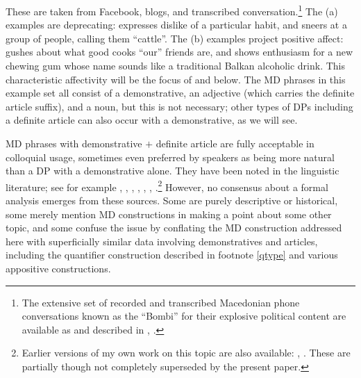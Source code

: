 \documentclass[output=paper,
colorlinks,
citecolor=brown,
newtxmath
]{langscibook}
\begin{document}
\noindent These are taken from Facebook, blogs, and transcribed conversation.\footnote{The extensive set of recorded and transcribed Macedonian phone conversations known as the ``Bombi'' for their explosive political content are available as \cite{Prizma2015} and described in \cite{Friedman2016}, \cite{Friedman2019}.} The (a) examples are deprecating:  expresses dislike of a particular habit, and  sneers at a group of people, calling them ``cattle''. The (b) examples project positive affect:  gushes about what good cooks ``our'' friends are, and  shows enthusiasm for a new chewing gum whose name sounds like a traditional Balkan alcoholic drink. This characteristic affectivity will be the focus of  and  below. The MD phrases in this example set all consist of a demonstrative, an adjective (which carries the definite article suffix), and a noun, but this is not necessary; other types of DPs including a definite article can also occur with a demonstrative, as we will see.

MD phrases with demonstrative $+$ definite article are fully acceptable in colloquial usage, sometimes even preferred by speakers as being more natural than a DP with a demonstrative alone. They have been noted in the linguistic literature; see for example \cite{Ugrinova-Skalovska1960/61}, \cite{Arnaudova1998}, \cite{Tasseva-Kurktchieva2006}, \cite{Hauge1999}, \cite{Mladenova2007}, \cite{Dimitrova-Vulchanova.Tomic2009},  \cite{Friedman2019}.\footnote{Earlier versions of my own work on this topic are also available: \cite{Rudin2018}, \cite{RudinToAppear}. These are partially though not completely superseded by the present paper.} However, no consensus about a formal analysis emerges from these sources. Some are purely descriptive or historical, some merely mention MD constructions in making a point about some other topic, and
some confuse the issue by conflating the MD construction addressed here with superficially similar data involving demonstratives and articles, including the quantifier construction described in footnote \ref{qtype} and various appositive constructions.

    \largerpage
\end{document}
